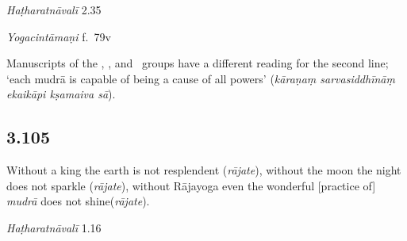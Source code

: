 \begin{ekdosis}
\begin{sources}[hp03_104]
\end{sources}

\begin{testimonia}[hp03_104]

\emph{Haṭharatnāvalī} 2.35
\begin{versinnote}
\end{versinnote}

\emph{Yogacintāmaṇi} f.~79v
\begin{versinnote}
\end{versinnote}

\end{testimonia}

\begin{philcomm}[hp03_104]
Manuscripts of the \textbeta, \texteta, and \textepsilon\ groups have a different reading for the second line; `each mudrā is capable of being a cause of all powers' (\emph{kāraṇaṃ sarvasiddhīnāṃ ekaikāpi kṣamaiva sā}).
\end{philcomm}


\subsection*{3.105}
\begin{translation}[hp03_105]
Without a king the earth is not resplendent (\emph{rājate}), without the moon the night does not sparkle (\emph{rājate}), without Rājayoga even the wonderful [practice of] \emph{mudrā} does not shine(\emph{rājate}).
\end{translation}



\begin{testimonia}[hp03_105]
\emph{Haṭharatnāvalī} 1.16
\begin{versinnote}
\end{versinnote}


\end{testimonia}
\end{ekdosis}

